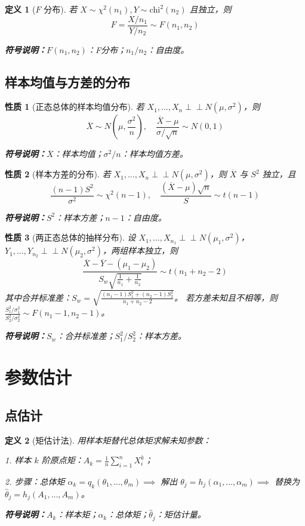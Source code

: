 \documentclass[11pt,a4paper,oneside]{article}
\theoremstyle{yhbthm}
\newtheorem{definition}{定义}[section]
\newtheorem{property}{性质}[section]
\newcommand{\indep}{\perp \!\!\! \perp}
\newcommand{\samplemean}[1]{\overline{#1}}
\newcommand{\samplevar}[1]{S_{#1}^2}
\newcommand{\symnote}[1]{\par\noindent\textbf{符号说明：}#1\par}
\begin{document}
\begin{definition}[$F$ 分布]
若 $X \sim \chi^2(n_1), Y \sim \text{chi}^2(n_2)$ 且独立，则
$$
F = \frac{X/n_1}{Y/n_2} \sim F(n_1, n_2)
$$
\symnote{$F(n_1,n_2)$：F分布；$n_1/n_2$：自由度。}
\end{definition}

\subsection{样本均值与方差的分布}
\begin{property}[正态总体的样本均值分布]
若 $X_1,\dots,X_n \indep N(\mu,\sigma^2)$，则
$$
\samplemean{X} \sim N\left(\mu, \frac{\sigma^2}{n}\right), \quad \frac{\samplemean{X} - \mu}{\sigma/\sqrt{n}} \sim N(0,1)
$$
\symnote{$\samplemean{X}$：样本均值；$\sigma^2/n$：样本均值方差。}
\end{property}

\begin{property}[样本方差的分布]
若 $X_1,\dots,X_n \indep N(\mu,\sigma^2)$，则 $\samplemean{X}$ 与 $S^2$ 独立，且
$$
\frac{(n-1)S^2}{\sigma^2} \sim \chi^2(n-1), \quad \frac{(\samplemean{X} - \mu)\sqrt{n}}{S} \sim t(n-1)
$$
\symnote{$S^2$：样本方差；$n-1$：自由度。}
\end{property}

\begin{property}[两正态总体的抽样分布]
设 $X_1,\dots,X_{n_1} \indep N(\mu_1,\sigma^2)$，$Y_1,\dots,Y_{n_2} \indep N(\mu_2,\sigma^2)$，两组样本独立，则
$$
\frac{\samplemean{X} - \samplemean{Y} - (\mu_1 - \mu_2)}{S_w \sqrt{\frac{1}{n_1} + \frac{1}{n_2}}} \sim t(n_1 + n_2 - 2)
$$
其中合并标准差：$S_w = \sqrt{\frac{(n_1-1)\samplevar{1} + (n_2-1)\samplevar{2}}{n_1 + n_2 - 2}}$。
若方差未知且不相等，则 $\frac{\samplevar{1}/\sigma_1^2}{\samplevar{2}/\sigma_2^2} \sim F(n_1-1, n_2-1)$。
\symnote{$S_w$：合并标准差；$\samplevar{1}/\samplevar{2}$：样本方差。}
\end{property}

\section{参数估计}
\subsection{点估计}
\begin{definition}[矩估计法]
用样本矩替代总体矩求解未知参数：

1. 样本 $k$ 阶原点矩：$A_k = \frac{1}{n} \sum_{i=1}^n X_i^k$；

2. 步骤：总体矩 $\alpha_k = q_k(\theta_1,\dots,\theta_m) \implies$ 解出 $\theta_j = h_j(\alpha_1,\dots,\alpha_m) \implies$ 替换为 $\hat{\theta}_j = h_j(A_1,\dots,A_m)$。
\symnote{$A_k$：样本矩；$\alpha_k$：总体矩；$\hat{\theta}_j$：矩估计量。}
\end{definition}
\end{document}

